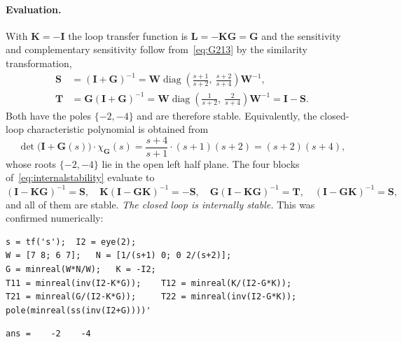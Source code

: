 \paragraph{Evaluation.} With $\mathbf{K}=-\mathbf{I}$ the loop transfer function is
$\mathbf{L}=-\mathbf{K}\mathbf{G}=\mathbf{G}$ and the sensitivity and complementary sensitivity
follow from~\eqref{eq:G213} by the similarity transformation,
\begin{align}
    \mathbf{S} &= (\mathbf{I}+\mathbf{G})^{-1}
    = \mathbf{W}\operatorname{diag}\!\left(\frac{s+1}{s+2},\ \frac{s+2}{s+4}\right)\mathbf{W}^{-1},
    \label{eq:S213}\\
    \mathbf{T} &= \mathbf{G}(\mathbf{I}+\mathbf{G})^{-1}
    = \mathbf{W}\operatorname{diag}\!\left(\frac{1}{s+2},\ \frac{2}{s+4}\right)\mathbf{W}^{-1}
    = \mathbf{I}-\mathbf{S}.
    \label{eq:T213}
\end{align}
Both have the poles $\{-2,-4\}$ and are therefore stable. Equivalently, the closed-loop
characteristic polynomial is obtained from
\begin{equation}
    \det\big(\mathbf{I}+\mathbf{G}(s)\big)\cdot\chi_{\mathbf{G}}(s)
    = \frac{s+4}{s+1}\cdot(s+1)(s+2) = (s+2)(s+4),
    \label{eq:charpoly213}
\end{equation}
whose roots $\{-2,-4\}$ lie in the open left half plane. The four blocks
of~\eqref{eq:internalstability} evaluate to
\begin{equation}
    (\mathbf{I}-\mathbf{K}\mathbf{G})^{-1}=\mathbf{S},\quad
    \mathbf{K}(\mathbf{I}-\mathbf{G}\mathbf{K})^{-1}=-\mathbf{S},\quad
    \mathbf{G}(\mathbf{I}-\mathbf{K}\mathbf{G})^{-1}=\mathbf{T},\quad
    (\mathbf{I}-\mathbf{G}\mathbf{K})^{-1}=\mathbf{S},
    \label{eq:fourblocks}
\end{equation}
and all of them are stable. \emph{The closed loop is internally stable.} This was confirmed
numerically:

\begin{lstlisting}
s = tf('s');  I2 = eye(2);
W = [7 8; 6 7];   N = [1/(s+1) 0; 0 2/(s+2)];
G = minreal(W*N/W);   K = -I2;
T11 = minreal(inv(I2-K*G));    T12 = minreal(K/(I2-G*K));
T21 = minreal(G/(I2-K*G));     T22 = minreal(inv(I2-G*K));
pole(minreal(ss(inv(I2+G))))'
\end{lstlisting}
\begin{lstlisting}[style=matlabout]
ans =    -2    -4
\end{lstlisting}


